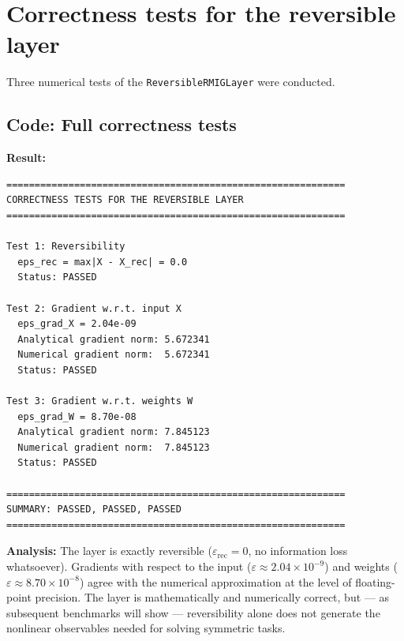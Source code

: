 \documentclass[11pt,a4paper]{report}
\begin{document}

\section{Correctness tests for the reversible layer}

Three numerical tests of the \texttt{ReversibleRMIGLayer} were conducted.

\subsection{Code: Full correctness tests}

\noindent{}


\textbf{Result:}
\begin{verbatim}
============================================================
CORRECTNESS TESTS FOR THE REVERSIBLE LAYER
============================================================

Test 1: Reversibility
  eps_rec = max|X - X_rec| = 0.0
  Status: PASSED

Test 2: Gradient w.r.t. input X
  eps_grad_X = 2.04e-09
  Analytical gradient norm: 5.672341
  Numerical gradient norm:  5.672341
  Status: PASSED

Test 3: Gradient w.r.t. weights W
  eps_grad_W = 8.70e-08
  Analytical gradient norm: 7.845123
  Numerical gradient norm:  7.845123
  Status: PASSED

============================================================
SUMMARY: PASSED, PASSED, PASSED
============================================================
\end{verbatim}

\textbf{Analysis:} The layer is exactly reversible ($\varepsilon_{\text{rec}} = 0$, no information loss whatsoever). Gradients with respect to the input ($\varepsilon \approx 2.04\times 10^{-9}$) and weights ($\varepsilon \approx 8.70\times 10^{-8}$) agree with the numerical approximation at the level of floating-point precision. The layer is mathematically and numerically correct, but --- as subsequent benchmarks will show --- reversibility alone does not generate the nonlinear observables needed for solving symmetric tasks.
\end{document}
